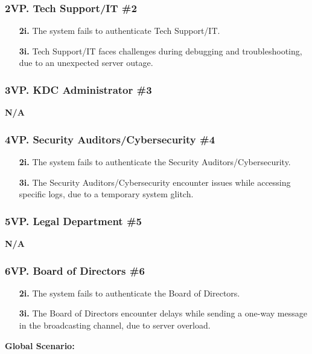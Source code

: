 \documentclass[]{article}
\begin{document}
\subsubsection*{2VP. Tech Support/IT \#2}
\begin{enumerate}
	\item[\textbf{2i.}] The system fails to authenticate Tech Support/IT.
	\item[\textbf{3i.}] Tech Support/IT faces challenges during debugging and troubleshooting, due to an unexpected server outage.
\end{enumerate}
\subsubsection*{3VP. KDC Administrator \#3}
\textbf{N/A}
\subsubsection*{4VP. Security Auditors/Cybersecurity \#4}
\begin{enumerate}
	\item[\textbf{2i.}] The system fails to authenticate the Security Auditors/Cybersecurity.
	\item[\textbf{3i.}] The Security Auditors/Cybersecurity encounter issues while accessing specific logs, due to a temporary system glitch.
\end{enumerate}
\subsubsection*{5VP. Legal Department \#5}
\textbf{N/A}
\subsubsection*{6VP. Board of Directors \#6}
\begin{enumerate}
	\item[\textbf{2i.}] The system fails to authenticate the Board of Directors.
	\item[\textbf{3i.}] The Board of Directors encounter delays while sending a one-way message in the broadcasting channel, due to server overload.
\end{enumerate}
\textbf{Global Scenario:}
\end{document}
